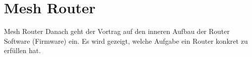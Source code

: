 \section{Mesh Router}

\begin{frame}{Mesh Router}
Danach geht der Vortrag auf den inneren Aufbau der Router Software
(Firmware) ein. Es wird gezeigt, welche Aufgabe ein Router konkret
zu erfüllen hat.
\end{frame}
